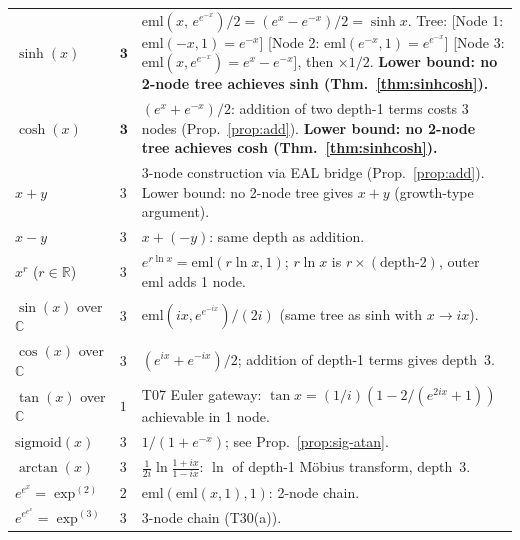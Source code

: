 \documentclass[12pt,a4paper]{article}
\theoremstyle{definition}
\theoremstyle{remark}
\begin{document}
\begin{longtable}{@{}llp{8cm}@{}}
$\sinh(x)$
  & $\mathbf{3}$
  & $\mathrm{eml}(x,\, e^{e^{-x}}) / 2 = (e^x - e^{-x})/2 = \sinh x$.
    Tree: [Node 1: $\mathrm{eml}(-x,1) = e^{-x}$]
    [Node 2: $\mathrm{eml}(e^{-x},1) = e^{e^{-x}}$]
    [Node 3: $\mathrm{eml}(x,e^{e^{-x}}) = e^x - e^{-x}$], then $\times 1/2$.
    \textbf{Lower bound: no 2-node tree achieves sinh (Thm.~\ref{thm:sinhcosh}).} \\[4pt]

$\cosh(x)$
  & $\mathbf{3}$
  & $(e^x + e^{-x})/2$: addition of two depth-1 terms costs 3 nodes (Prop.~\ref{prop:add}).
    \textbf{Lower bound: no 2-node tree achieves cosh (Thm.~\ref{thm:sinhcosh}).} \\[2pt]

$x + y$
  & $3$
  & 3-node construction via EAL bridge (Prop.~\ref{prop:add}).
    Lower bound: no 2-node tree gives $x+y$ (growth-type argument). \\[2pt]

$x - y$
  & $3$
  & $x + (-y)$: same depth as addition. \\[2pt]

$x^r$ ($r \in \mathbb{R}$)
  & $3$
  & $e^{r\ln x} = \mathrm{eml}(r\ln x, 1)$; $r\ln x$ is $r \times(\text{depth-2})$,
    outer $\mathrm{eml}$ adds 1 node. \\[2pt]

$\sin(x)$ over $\mathbb{C}$
  & $3$
  & $\mathrm{eml}(ix, e^{e^{-ix}}) / (2i)$ (same tree as sinh with $x\to ix$). \\[2pt]

$\cos(x)$ over $\mathbb{C}$
  & $3$
  & $(e^{ix}+e^{-ix})/2$; addition of depth-1 terms gives depth~3. \\[2pt]

$\tan(x)$ over $\mathbb{C}$
  & $1$
  & T07 Euler gateway: $\tan x = (1/i)(1 - 2/(e^{2ix}+1))$ achievable in 1 node. \\[2pt]

$\mathrm{sigmoid}(x)$
  & $3$
  & $1/(1+e^{-x})$; see Prop.~\ref{prop:sig-atan}. \\[2pt]

$\arctan(x)$
  & $3$
  & $\frac{1}{2i}\ln\frac{1+ix}{1-ix}$: $\ln$ of depth-1 M\"{o}bius transform, depth~3. \\[4pt]

$e^{e^x} = \exp^{(2)}$
  & $2$
  & $\mathrm{eml}(\mathrm{eml}(x,1),1)$: 2-node chain. \\[2pt]

$e^{e^{e^x}} = \exp^{(3)}$
  & $3$
  & 3-node chain (T30(a)). \\[2pt]


\end{longtable}
\end{document}
